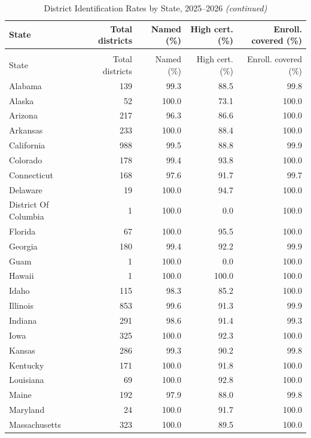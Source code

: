 \begingroup\fontsize{9}{11}\selectfont

\begin{longtable}[t]{lrrrr}
\caption{\label{tab:combined}District Identification Rates by State, 2025--2026}\\
\toprule
State & Total districts & Named (\%) & High cert. (\%) & Enroll. covered (\%)\\
\midrule
\endfirsthead
\caption[]{District Identification Rates by State, 2025--2026 \textit{(continued)}}\\
\toprule
State & Total districts & Named (\%) & High cert. (\%) & Enroll. covered (\%)\\
\midrule
\endhead

\endfoot
\bottomrule
\endlastfoot
Alabama & 139 & 99.3 & 88.5 & 99.8\\
Alaska & 52 & 100.0 & 73.1 & 100.0\\
Arizona & 217 & 96.3 & 86.6 & 100.0\\
Arkansas & 233 & 100.0 & 88.4 & 100.0\\
California & 988 & 99.5 & 88.8 & 99.9\\
\addlinespace
Colorado & 178 & 99.4 & 93.8 & 100.0\\
Connecticut & 168 & 97.6 & 91.7 & 99.7\\
Delaware & 19 & 100.0 & 94.7 & 100.0\\
District Of Columbia & 1 & 100.0 & 0.0 & 100.0\\
Florida & 67 & 100.0 & 95.5 & 100.0\\
\addlinespace
Georgia & 180 & 99.4 & 92.2 & 99.9\\
Guam & 1 & 100.0 & 0.0 & 100.0\\
Hawaii & 1 & 100.0 & 100.0 & 100.0\\
Idaho & 115 & 98.3 & 85.2 & 100.0\\
Illinois & 853 & 99.6 & 91.3 & 99.9\\
\addlinespace
Indiana & 291 & 98.6 & 91.4 & 99.3\\
Iowa & 325 & 100.0 & 92.3 & 100.0\\
Kansas & 286 & 99.3 & 90.2 & 99.8\\
Kentucky & 171 & 100.0 & 91.8 & 100.0\\
Louisiana & 69 & 100.0 & 92.8 & 100.0\\
\addlinespace
Maine & 192 & 97.9 & 88.0 & 99.8\\
Maryland & 24 & 100.0 & 91.7 & 100.0\\
Massachusetts & 323 & 100.0 & 89.5 & 100.0\\

\end{longtable}

